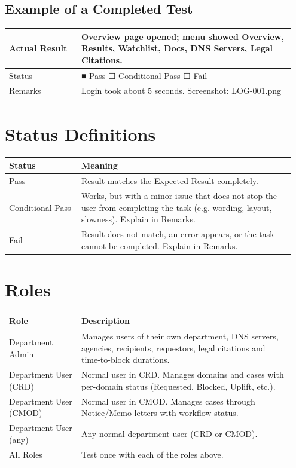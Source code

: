 \documentclass[10pt]{article}
\begin{document}
\subsection{Example of a Completed Test}
\begin{longtable}{p{0.24\linewidth}p{0.71\linewidth}}
\hline
Actual Result & Overview page opened; menu showed Overview, Results, Watchlist, Docs, DNS Servers, Legal Citations. \\ \hline
Status & ■ Pass \quad ☐ Conditional Pass \quad ☐ Fail \\ \hline
Remarks & Login took about 5 seconds. Screenshot: LOG-001.png \\ \hline
\end{longtable}

\section{Status Definitions}
\begin{longtable}{p{0.24\linewidth}p{0.71\linewidth}}
\hline
\textbf{Status} & \textbf{Meaning} \\ \hline
\endhead
Pass & Result matches the Expected Result completely. \\ \hline
Conditional Pass & Works, but with a minor issue that does not stop the user from completing the task (e.g. wording, layout, slowness). Explain in Remarks. \\ \hline
Fail & Result does not match, an error appears, or the task cannot be completed. Explain in Remarks. \\ \hline
\end{longtable}

\section{Roles}
\begin{longtable}{p{0.24\linewidth}p{0.71\linewidth}}
\hline
\textbf{Role} & \textbf{Description} \\ \hline
\endhead

Department Admin & Manages users of their own department, DNS servers, agencies, recipients, requestors, legal citations and time-to-block durations. \\ \hline
Department User (CRD) & Normal user in CRD. Manages domains and cases with per-domain status (Requested, Blocked, Uplift, etc.). \\ \hline
Department User (CMOD) & Normal user in CMOD. Manages cases through Notice/Memo letters with workflow status. \\ \hline
Department User (any) & Any normal department user (CRD or CMOD). \\ \hline
All Roles & Test once with each of the roles above. \\ \hline
\end{longtable}
\end{document}
